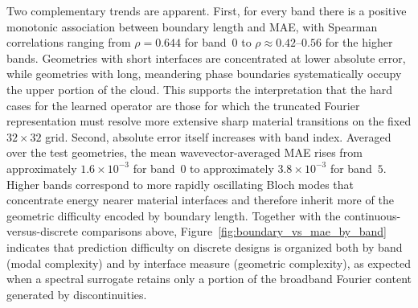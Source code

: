 \documentclass[preprint,review,12pt]{elsarticle}
\begin{document}
Two complementary trends are apparent. First, for every band there is a positive monotonic association between boundary length and MAE, with Spearman correlations ranging from $\rho=0.644$ for band~$0$ to $\rho\approx0.42$--$0.56$ for the higher bands. Geometries with short interfaces are concentrated at lower absolute error, while geometries with long, meandering phase boundaries systematically occupy the upper portion of the cloud. This supports the interpretation that the hard cases for the learned operator are those for which the truncated Fourier representation must resolve more extensive sharp material transitions on the fixed $32\times32$ grid.
Second, absolute error itself increases with band index. Averaged over the test geometries, the mean wavevector-averaged MAE rises from approximately $1.6\times10^{-3}$ for band~$0$ to approximately $3.8\times10^{-3}$ for band~$5$. Higher bands correspond to more rapidly oscillating Bloch modes that concentrate energy nearer material interfaces and therefore inherit more of the geometric difficulty encoded by boundary length. Together with the continuous-versus-discrete comparisons above, Figure~\ref{fig:boundary_vs_mae_by_band} indicates that prediction difficulty on discrete designs is organized both by band (modal complexity) and by interface measure (geometric complexity), as expected when a spectral surrogate retains only a portion of the broadband Fourier content generated by discontinuities.

\end{document}
